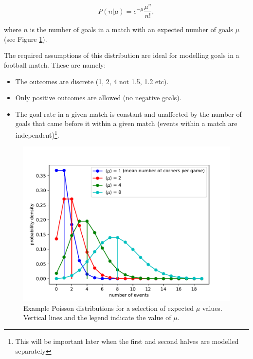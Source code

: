 \documentclass[10pt]{article}
\begin{document}
\begin{equation}
P(n|\mu) = e^{-\mu}\frac{\mu^n}{n!},
\end{equation}

\noindent where $n$ is the number of goals in a match with an expected number of goals $\mu$ (see Figure \ref{fig_poison}).

The required assumptions of this distribution are ideal for modelling goals in a football match. These are namely:

\begin{itemize}
\item The outcomes are discrete (1, 2, 4 not 1.5, 1.2 etc). 

\item Only positive outcomes are allowed (no negative goals).

\item The goal rate in a given match is constant and unaffected by the number of goals that came before it within a given match (events within a match are independent)\footnote{This will be important later when the first and second halves are modelled separately}.



\end{itemize}





\begin{figure}
\begin{center}
\includegraphics[scale=1.0,angle=0,trim=0cm 0cm 0cm 0cm]{fig_poison.pdf}
\caption{Example Poisson distributions for a selection of expected $\mu$ values. Vertical lines and the legend indicate the value of $\mu$.}
\label{fig_poison}
\end{center}
\end{figure} 
\end{document}
